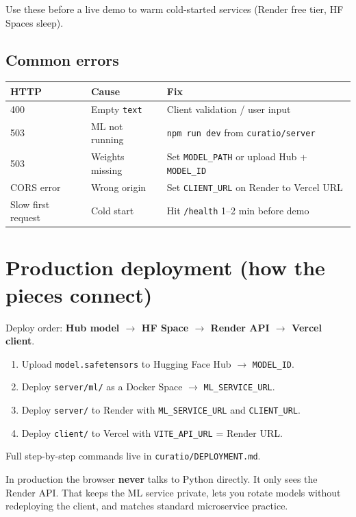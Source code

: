 \documentclass[11pt]{article}
\newcommand{\route}[1]{{\small\texttt{\textcolor{mutel}{#1}}}}
\begin{document}
Use these before a live demo to warm cold-started services (Render free tier, HF Spaces sleep).

\subsection{Common errors}

\begin{center}
\begin{tabular}{@{}llp{}@{}}
\toprule
\textbf{HTTP} & \textbf{Cause} & \textbf{Fix} \\
\midrule
400 & Empty \texttt{text} & Client validation / user input \\
503 & ML not running & \texttt{npm run dev} from \route{curatio/server} \\
503 & Weights missing & Set \texttt{MODEL\_PATH} or upload Hub + \texttt{MODEL\_ID} \\
CORS error & Wrong origin & Set \texttt{CLIENT\_URL} on Render to Vercel URL \\
Slow first request & Cold start & Hit \texttt{/health} 1--2 min before demo \\
\bottomrule
\end{tabular}
\end{center}

\section{Production deployment (how the pieces connect)}

Deploy order: \textbf{Hub model $\to$ HF Space $\to$ Render API $\to$ Vercel client}.

\begin{enumerate}
  \item Upload \texttt{model.safetensors} to Hugging Face Hub $\to$ \texttt{MODEL\_ID}.
  \item Deploy \route{server/ml/} as a Docker Space $\to$ \texttt{ML\_SERVICE\_URL}.
  \item Deploy \route{server/} to Render with \texttt{ML\_SERVICE\_URL} and \texttt{CLIENT\_URL}.
  \item Deploy \route{client/} to Vercel with \texttt{VITE\_API\_URL} = Render URL.
\end{enumerate}

Full step-by-step commands live in \route{curatio/DEPLOYMENT.md}.

\begin{idea}
In production the browser \textbf{never} talks to Python directly. It only sees the Render API.
That keeps the ML service private, lets you rotate models without redeploying the client, and
matches standard microservice practice.
\end{idea}
\end{document}
